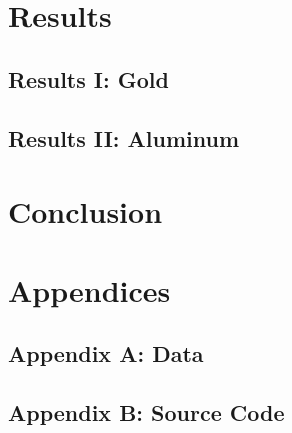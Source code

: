 \documentclass[a4paper]{article}
\begin{document}
\qq 

\qq 

\qq 

\section{Results}

\subsection{Results I: Gold}

\qq 

\qq 

\qq

\subsection{Results II: Aluminum}

\qq 

\qq 

\qq

\section{Conclusion}

\qq 

\qq 

\section{Appendices}

\subsection{Appendix A: Data}

\subsection{Appendix B: Source Code}
\end{document}
